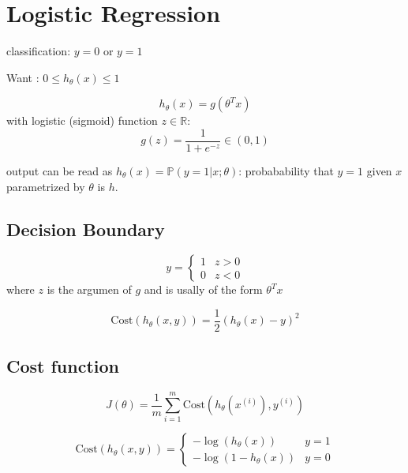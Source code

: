 \documentclass[a4paper,titlepage] {scrartcl}
\begin{document}



\section{Logistic Regression} %
\label{sec:logitic_regression}

classification: $y=0$ or $y=1$

Want : $0\leq h_{\theta}(x)\leq 1$

\begin{equation}
	h_{\theta}(x) = g(\theta^T x)
\end{equation}
with logistic (sigmoid) function $z\in\mathbb R$:
\begin{equation}
	g(z) = \frac{1}{1+e^{-z}} \in (0,1)
\end{equation}

output can be read as $h_\theta(x) = \mathbb P(y=1|x;\theta)$: probabability that $y=1$ given $x$ parametrized by $\theta$ is $h$.

\subsection{Decision Boundary} %
\label{par:decision_boundary}

\begin{equation}
	y=
	\begin{cases}
	1 & z>0\\
	0 & z<0	
	\end{cases}
\end{equation}
where $z$ is the argumen of $g$ and is usally of the form $\theta^Tx$


\begin{equation}
	\text{Cost}(h_{\theta}(x,y))=\frac{1}{2}(h_\theta(x) - y)^2
\end{equation}

\subsection{Cost function} %
\label{par:logistic_regression_cost_function}

\begin{equation}
	J(\theta) = \frac{1}{m}\sum_{i=1}^m\text{Cost}(h_\theta(x^{(i)}),y^{(i)})
\end{equation}

\begin{equation}
	\text{Cost}(h_{\theta}(x,y)) =
	\begin{cases}
		-\log{(h_\theta(x))} & y=1
		\\
		-\log{(1-h_\theta(x))} & y=0
	\end{cases}
\end{equation}
\end{document}
